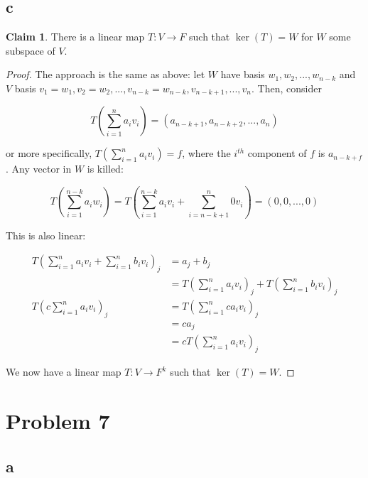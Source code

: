 \documentclass[12pt,letterpaper]{article}
\theoremstyle{definition}
\newtheorem*{claim}{Claim}
\begin{document}
\subsection*{c}

\begin{claim}
  There is a linear map $T: V \rightarrow F$ such that $\ker(T) = W$ for $W$
  some subspace of $V$.
\end{claim}

\begin{proof}
  The approach is the same as above: let $W$ have basis $w_1, w_2, ..., w_{n-k}$
  and $V$ basis $v_1 = w_1, v_2 = w_2, ..., v_{n-k} = w_{n-k}, v_{n - k + 1}, ...,
  v_n$. Then, consider

  \[
    T(\sum_{i=1}^{n} a_iv_i) = (a_{n-k+1}, a_{n-k + 2}, ..., a_{n})
  \]

  or more specifically, $T(\sum_{i=1}^{n} a_iv_i) = f$, where the $i^{th}$
  component of $f$ is $a_{n - k + f}$. Any vector in $W$ is killed:

  \[
    T(\sum_{i=1}^{n-k}a_iw_i) = T(\sum_{i=1}^{n-k}a_iv_i + \sum_{i=n-k +
      1}^{n}0 v_i) = (0, 0, ..., 0)
  \]

  This is also linear:

  \begin{align*}
    T(\sum_{i=1}^{n} a_iv_i + \sum_{i=1}^{n} b_iv_i)_j &= a_j + b_j \\
                                                       &= T(\sum_{i=1}^{n} a_iv_i)_j + T(\sum_{i=1}^{n} b_iv_i)_j \\
    T(c\sum_{i=1}^{n} a_iv_i)_j &= T(\sum_{i=1}^{n} ca_iv_i)_j \\
                                                       &= ca_j \\
                                                       &= cT(\sum_{i=1}^{n} a_iv_i)_j
  \end{align*}

  We now have a linear map $T: V \rightarrow F^k$ such that $\ker(T) = W$.
\end{proof}

\section*{Problem 7}

\subsection*{a}
\end{document}
